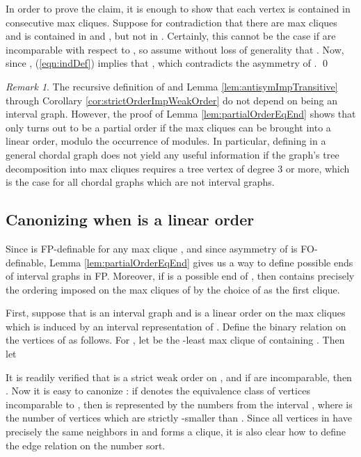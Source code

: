 \documentclass[10pt]{article}
\theoremstyle{remark}
\newtheorem{remark}[thm]{Remark}
\theoremstyle{definition}
\theoremstyle{plain}
\newcommand{\logic}[1]{\textsf{\upshape\relsize{-0.5}#1}\xspace}
\newcommand{\FP}{\logic{FP}}
\newcommand{\FOL}{\logic{FO}}
\begin{document}
In order to prove the claim, it is enough to show that each vertex  is contained in consecutive max cliques. Suppose for contradiction that there are max cliques  and  is contained in  and , but not in . Certainly, this cannot be the case if  are incomparable with respect to , so assume without loss of generality that . Now, since , (\ref{eqn:indDef}) implies that , which contradicts the asymmetry of . \qed

\begin{remark} \label{remark:doesntWorkGenerally}
 The recursive definition of  and Lemma \ref{lem:antisymImpTransitive} through Corollary \ref{cor:strictOrderImpWeakOrder} do not depend on  being an interval graph. However, the proof of Lemma \ref{lem:partialOrderEqEnd} shows that  only turns out to be a partial order if the max cliques can be brought into a linear order, modulo the occurrence of modules. In particular, defining  in a general chordal graph does not yield any useful information if the graph's tree decomposition into max cliques requires a tree vertex of degree 3 or more, which is the case for all chordal graphs which are not interval graphs.
\end{remark}


\subsection{Canonizing when  is a linear order}\label{subsec:canLinOrder}

Since  is \FP-definable for any max clique , and since asymmetry of  is \FOL-definable, Lemma \ref{lem:partialOrderEqEnd} gives us a way to define possible ends of interval graphs in \FP. Moreover, if  is a possible end of , then  contains precisely the ordering imposed on the max cliques of  by the choice of  as the first clique.

First, suppose that  is an interval graph and  is a linear order on the max cliques which is induced by an interval representation of . Define the binary relation  on the vertices of  as follows. For , let  be the -least max clique of  containing . Then let


It is readily verified that  is a strict weak order on , and if  are incomparable, then . Now it is easy to canonize : if  denotes the equivalence class of vertices incomparable to , then  is represented by the numbers from the interval , where  is the number of vertices which are strictly -smaller than . Since all vertices in  have precisely the same neighbors in  and  forms a clique, it is also clear how to define the edge relation on the number sort.
\end{document}

